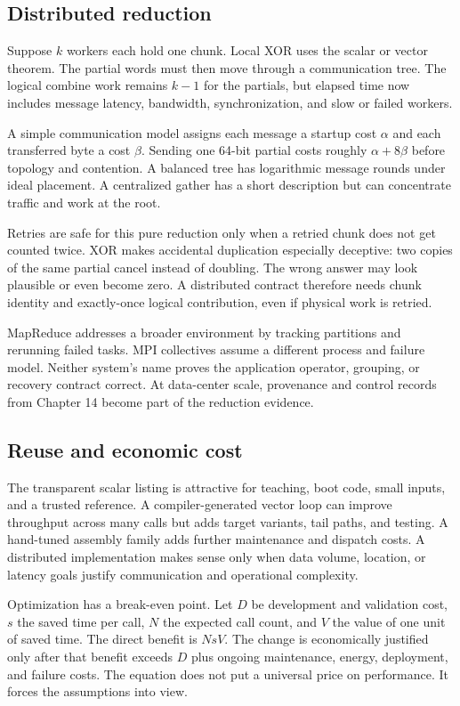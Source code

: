 \subsection{Distributed reduction}

Suppose \(k\) workers each hold one chunk. Local XOR uses the scalar or vector
theorem. The partial words must then move through a communication tree. The
logical combine work remains \(k-1\) for the partials, but elapsed time now
includes message latency, bandwidth, synchronization, and slow or failed
workers.

A simple communication model assigns each message a startup cost \(\alpha\)
and each transferred byte a cost \(\beta\). Sending one 64-bit partial costs
roughly \(\alpha+8\beta\) before topology and contention. A balanced tree has
logarithmic message rounds under ideal placement. A centralized gather has a
short description but can concentrate traffic and work at the root.

Retries are safe for this pure reduction only when a retried chunk does not get
counted twice. XOR makes accidental duplication especially deceptive: two
copies of the same partial cancel instead of doubling. The wrong answer may
look plausible or even become zero. A distributed contract therefore needs
chunk identity and exactly-once logical contribution, even if physical work is
retried.

MapReduce addresses a broader environment by tracking partitions and rerunning
failed tasks. MPI collectives assume a different process and failure model.
Neither system's name proves the application operator, grouping, or recovery
contract correct. At data-center scale, provenance and control records from
Chapter 14 become part of the reduction evidence.

\subsection{Reuse and economic cost}

The transparent scalar listing is attractive for teaching, boot code, small
inputs, and a trusted reference. A compiler-generated vector loop can improve
throughput across many calls but adds target variants, tail paths, and testing.
A hand-tuned assembly family adds further maintenance and dispatch costs. A
distributed implementation makes sense only when data volume, location, or
latency goals justify communication and operational complexity.

Optimization has a break-even point. Let \(D\) be development and validation
cost, \(s\) the saved time per call, \(N\) the expected call count, and \(V\)
the value of one unit of saved time. The direct benefit is \(NsV\). The change
is economically justified only after that benefit exceeds \(D\) plus ongoing
maintenance, energy, deployment, and failure costs. The equation does not put
a universal price on performance. It forces the assumptions into view.

